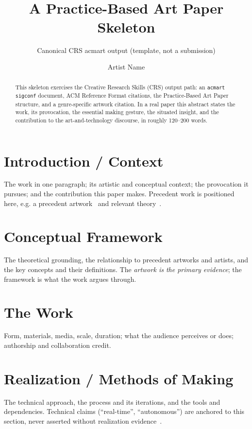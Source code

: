 \documentclass[sigconf,nonacm]{acmart}
\begin{document}
\title{A Practice-Based Art Paper Skeleton}
\subtitle{Canonical CRS acmart output (template, not a submission)}

\author{Artist Name}

\begin{abstract}
This skeleton exercises the Creative Research Skills (CRS) output path: an
\texttt{acmart} \texttt{sigconf} document, ACM Reference Format citations, the
Practice-Based Art Paper structure, and a genre-specific artwork citation. In a
real paper this abstract states the work, its provocation, the essential making
gesture, the situated insight, and the contribution to the art-and-technology
discourse, in roughly 120--200 words.
\end{abstract}


\maketitle

\section{Introduction / Context}
The work in one paragraph; its artistic and conceptual context; the provocation
it pursues; and the contribution this paper makes. Precedent work is positioned
here, e.g. a precedent artwork~\cite{precedentArtwork} and relevant
theory~\cite{leonardoArticle}.

\section{Conceptual Framework}
The theoretical grounding, the relationship to precedent artworks and artists,
and the key concepts and their definitions. The \emph{artwork is the primary
evidence}; the framework is what the work argues through.

\section{The Work}
Form, materials, media, scale, duration; what the audience perceives or does;
authorship and collaboration credit.

\section{Realization / Methods of Making}
The technical approach, the process and its iterations, and the tools and
dependencies. Technical claims (``real-time'', ``autonomous'') are anchored to
this section, never asserted without realization evidence~\cite{siggraphWork}.
\end{document}
